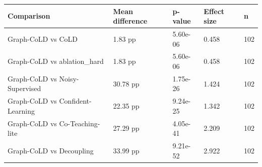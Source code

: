 \small
\begin{tabular}{lllll}
\hline
Comparison & Mean difference & p-value & Effect size & n \\
\hline
Graph-CoLD vs CoLD & 1.83 pp & 5.60e-06 & 0.458 & 102 \\
Graph-CoLD vs ablation\_hard & 1.83 pp & 5.60e-06 & 0.458 & 102 \\
Graph-CoLD vs Noisy-Supervised & 30.78 pp & 1.75e-26 & 1.424 & 102 \\
Graph-CoLD vs Confident-Learning & 22.35 pp & 9.24e-25 & 1.342 & 102 \\
Graph-CoLD vs Co-Teaching-lite & 27.29 pp & 4.05e-41 & 2.209 & 102 \\
Graph-CoLD vs Decoupling & 33.99 pp & 9.21e-52 & 2.922 & 102 \\
\hline
\end{tabular}

